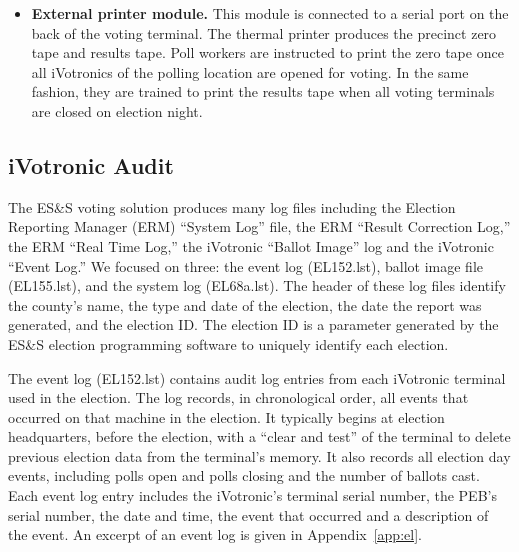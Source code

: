 \begin{itemize}
\item \textbf{External printer module.} This module is connected to a serial port on the back of the voting terminal. The thermal printer produces the precinct zero tape and results tape. Poll workers are instructed to print the zero tape once all iVotronics of the polling location are opened for voting. In the same fashion, they are trained to print the results tape when all voting terminals are closed on election night.
\end{itemize}

\subsection{iVotronic Audit}
The ES\&S voting solution produces many log files including the Election Reporting Manager (ERM) \textquotedblleft System Log\textquotedblright \hspace{1 mm} file, the ERM \textquotedblleft Result Correction Log,\textquotedblright \hspace{1 mm} the ERM \textquotedblleft Real Time Log,\textquotedblright \hspace{1 mm} the iVotronic \textquotedblleft Ballot Image\textquotedblright \hspace{1 mm} log and the iVotronic \textquotedblleft Event Log.\textquotedblright \hspace{2 mm} We focused on three: the event log (EL152.lst), ballot image file (EL155.lst), and the system log (EL68a.lst).  The header of these log files identify the county's name, the type and date of the election, the date the report was generated, and the election ID. The election ID is a parameter generated by the ES\&S election programming software to uniquely identify each election. 
 
The event log (EL152.lst) contains audit log entries from each iVotronic terminal used in the election.  The log  records, in  chronological order, all events that occurred on that machine in the election. It typically begins at election headquarters, before the election, with a \textquotedblleft clear and test\textquotedblright \hspace{1 mm} of the terminal to delete previous election data from the terminal's memory. It also records all election day events, including polls open and polls closing and the number of ballots cast.  Each event log entry includes the iVotronic's terminal serial number, the PEB's serial number, the date and time, the event that occurred and a description of the event. An excerpt of  an event log is given in  Appendix~\ref{app:el}. 
 
